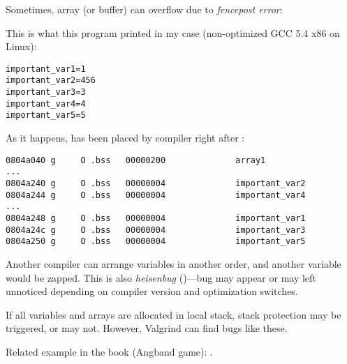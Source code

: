 \label{GlobalArraysOverflowHeisenbug}

Sometimes, array (or buffer) can overflow due to \emph{fencepost error}:



This is what this program printed in my case (non-optimized GCC 5.4 x86 on Linux):

\begin{lstlisting}
important_var1=1
important_var2=456
important_var3=3
important_var4=4
important_var5=5
\end{lstlisting}

As it happens,  has been placed by compiler right after :

\begin{lstlisting}[caption=objdump -x]
0804a040 g     O .bss   00000200              array1
...
0804a240 g     O .bss   00000004              important_var2
0804a244 g     O .bss   00000004              important_var4
...
0804a248 g     O .bss   00000004              important_var1
0804a24c g     O .bss   00000004              important_var3
0804a250 g     O .bss   00000004              important_var5
\end{lstlisting}

Another compiler can arrange variables in another order, and another variable would be zapped.
This is also \emph{heisenbug} ()---bug may appear or may left unnoticed
depending on compiler version and optimization switches.

If all variables and arrays are allocated in local stack, stack protection may be triggered, or may not.
However, Valgrind can find bugs like these.

Related example in the book (Angband game): .

